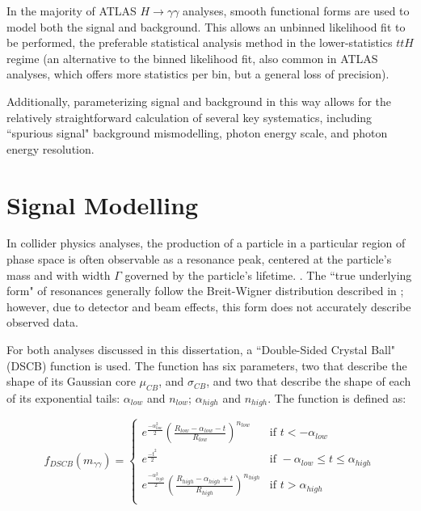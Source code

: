 In the majority of ATLAS $H \rightarrow \gamma \gamma$ analyses, smooth functional forms are used to model both the signal and background. This allows an unbinned likelihood fit to be performed, the preferable statistical analysis method in the lower-statistics $ttH$ regime (an alternative to the binned likelihood fit, also common in ATLAS analyses, which offers more statistics per bin, but a general loss of precision). 

Additionally, parameterizing signal and background in this way allows for the relatively straightforward calculation of several key systematics, including ``spurious signal" background mismodelling, photon energy scale, and photon energy resolution.

\section{Signal Modelling} \label{sec:example_section} 

In collider physics analyses, the production of a particle in a particular region of phase space is often observable as a resonance peak, centered at the particle's mass and with width $\Gamma$ governed by the particle's lifetime. \cite{Peskin}. The ``true underlying form" of resonances generally follow the Breit-Wigner distribution described in \cite{SlowNeutrons}; however, due to detector and beam effects, this form does not accurately describe observed data.

For both analyses discussed in this dissertation, a ``Double-Sided Crystal Ball" (DSCB) function \cite{CB}\cite{DSCB} is used. The function has six parameters, two that describe the shape of its Gaussian core $\mu_{CB}$, and $\sigma_{CB}$, and two that describe the shape of each of its exponential tails: $\alpha_{low}$ and $n_{low}$; $\alpha_{high}$ and $n_{high}$. The function is defined as:

\[f_{DSCB}(m_{\gamma \gamma}) = \begin{cases} 
      e^{\frac{-{\alpha_{low}^{2}}}{2}} (\frac{R_{low}-\alpha_{low}-t}{R_{low}})^{n_{low}} & \mbox{if } t < -\alpha_{low} \\
      e^{\frac{-t^{2}}{2}} & \mbox{if } -\alpha_{low} \leq t \leq \alpha_{high} \\
      e^{\frac{-{\alpha_{high}^{2}}}{2}} (\frac{R_{high}-\alpha_{high}+t}{R_{high}})^{n_{high}} & \mbox{if } t > \alpha_{high} \\
   \end{cases}
\]


